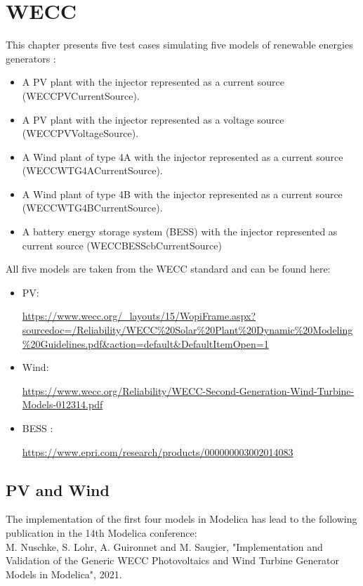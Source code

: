 \documentclass[a4paper, 12pt]{report}
\begin{document}
\newpage

\chapter{WECC}

This chapter presents five test cases simulating five models of renewable energies generators :
\begin{itemize}
\item A PV plant with the injector represented as a current source (WECCPVCurrentSource).
\item A PV plant with the injector represented as a voltage source (WECCPVVoltageSource).
\item A Wind plant of type 4A with the injector represented as a current source (WECCWTG4ACurrentSource).
\item A Wind plant of type 4B with the injector represented as a current source (WECCWTG4BCurrentSource).
\item A battery energy storage system (BESS) with the injector represented as current source (WECCBESScbCurrentSource)
\end{itemize}

All five models are taken from the WECC standard and can be found here:
\begin{itemize}
\item PV:

\url{https://www.wecc.org/\_layouts/15/WopiFrame.aspx?sourcedoc=/Reliability/WECC\%20Solar\%20Plant\%20Dynamic\%20Modeling\%20Guidelines.pdf\&action=default\&DefaultItemOpen=1}

\item Wind:

\url{https://www.wecc.org/Reliability/WECC-Second-Generation-Wind-Turbine-Models-012314.pdf}


\item BESS :

\url{https://www.epri.com/research/products/000000003002014083}
\end{itemize}


\section{PV and Wind}
The implementation of the first four models in Modelica has lead to the following publication in the 14th Modelica conference:\\

M. Nuschke, S. Lohr, A. Guironnet and M. Saugier, "Implementation and Validation of the Generic WECC Photovoltaics and Wind Turbine Generator Models in Modelica", 2021.\\
\end{document}
